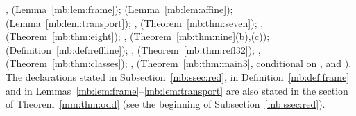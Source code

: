 ,  (Lemma~\ref{mb:lem:frame}); 
(Lemma~\ref{mb:lem:affine});  (Lemma~\ref{mb:lem:transport}); ,
 (Theorem~\ref{mb:thm:seven}); , 
(Theorem~\ref{mb:thm:eight}); ,  (Theorem~\ref{mb:thm:nine}(b),(c)); 
(Definition~\ref{mb:def:reflline}); , 
(Theorem~\ref{mb:thm:refl32}); , 
(Theorem~\ref{mb:thm:classes}); , 
(Theorem~\ref{mb:thm:main3}, conditional on ,  and ). The
declarations stated in Subsection~\ref{mb:ssec:red}, in
Definition~\ref{mb:def:frame} and in Lemmas~\ref{mb:lem:frame}--\ref{mb:lem:transport} are also stated in the section
of Theorem~\ref{mm:thm:odd} (see the beginning of Subsection~\ref{mb:ssec:red}).

